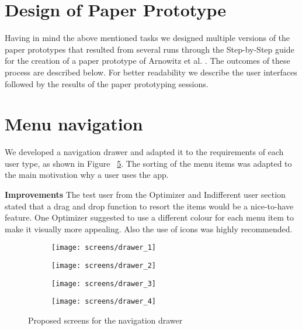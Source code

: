 \section{Design of Paper Prototype}
Having in mind the above mentioned tasks we designed multiple versions of the paper prototypes that resulted from several runs through the Step-by-Step guide for the creation of a paper prototype of Arnowitz et al. \cite{arnowitz2010effective}. The outcomes of these process are described below. For better readability we describe the user interfaces followed by the results of the paper prototyping sessions.

\section{Menu navigation}

We developed a navigation drawer and adapted it to the requirements of each user type, as shown in Figure ~\ref{fig:drawer}. The sorting of the menu items was adapted to the main motivation why a user uses the app.

\textbf{Improvements} \quad The test user from the Optimizer and Indifferent user section stated that a drag and drop function to resort the items would be a nice-to-have feature. One Optimizer suggested to use a different colour for each menu item to make it visually more appealing. Also the use of icons was highly recommended.

\begin{figure}[h]
	\centering
	\begin{subfigure}[b]{0.24\columnwidth}
		\centering
		\texttt{[image: screens/drawer\_1]}
		\label{fig:drawer:professional}
	\end{subfigure}
	\begin{subfigure}[b]{0.24\columnwidth}
		\centering
		\texttt{[image: screens/drawer\_2]}
		\label{fig:drawer:optimizer}
	\end{subfigure}
	\begin{subfigure}[b]{0.24\columnwidth}
		\centering
		\texttt{[image: screens/drawer\_3]}
		\label{fig:drawer:indifferent}
	\end{subfigure}
	\begin{subfigure}[b]{0.24\columnwidth}
		\centering
		\texttt{[image: screens/drawer\_4]}
		\label{fig:drawer:hedonist}
	\end{subfigure}
	\caption{Proposed screens for the navigation drawer}
	\label{fig:drawer} %
\end{figure}


